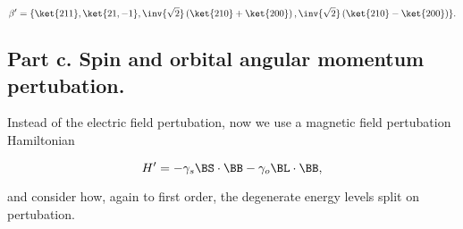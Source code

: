 \begin{equation}\label{eqn:qmTwoExamReflection:n}
\beta' = \{ 
\ket{211}, \ket{21,-1},
\inv{\sqrt{2}} 
\left(\ket{210}
+\ket{200}
\right),
\inv{\sqrt{2}} 
\left(\ket{210}
-\ket{200}
\right)
\}.
\end{equation}


\subsection{Part c.  Spin and orbital angular momentum pertubation.}

Instead of the electric field pertubation, now we use a magnetic field pertubation Hamiltonian

\begin{equation}\label{eqn:qmTwoExamReflection:n}
H' = 
-\gamma_s \BS \cdot \BB 
-\gamma_o \BL \cdot \BB,
\end{equation}

and consider how, again to first order, the degenerate energy levels split on pertubation.

\EndArticle
